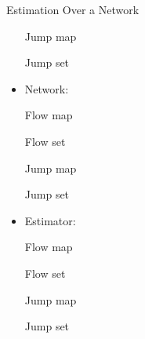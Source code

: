 \begin{example}{Estimation Over a Network}
\begin{itemize}
Jump map
\label{scr:g}

Jump set
\label{scr:D}

\item Network:

Flow map
\label{scr:f}

Flow set
\label{scr:C}

Jump map
\label{scr:g}

Jump set
\label{scr:D}

\item Estimator:

Flow map
\label{scr:f}

Flow set
\label{scr:C}

Jump map
\label{scr:g}

Jump set
\label{scr:D}
\end{itemize}

\end{example}